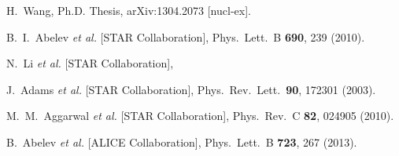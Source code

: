 \begin{thebibliography}{99}
  H.~Wang, Ph.D. Thesis,
  arXiv:1304.2073 [nucl-ex].

  B.~I.~Abelev {\it et al.} [STAR Collaboration],
  Phys.\ Lett.\ B {\bf 690}, 239 (2010).

  N.~Li {\it et al.} [STAR Collaboration],

  J.~Adams {\it et al.} [STAR Collaboration],
  Phys.\ Rev.\ Lett.\  {\bf 90}, 172301 (2003).
   
  M.~M.~Aggarwal {\it et al.} [STAR Collaboration],
  Phys.\ Rev.\ C {\bf 82}, 024905 (2010).


  B.~Abelev {\it et al.} [ALICE Collaboration],
  Phys.\ Lett.\ B {\bf 723}, 267 (2013).
  

\end{thebibliography}
